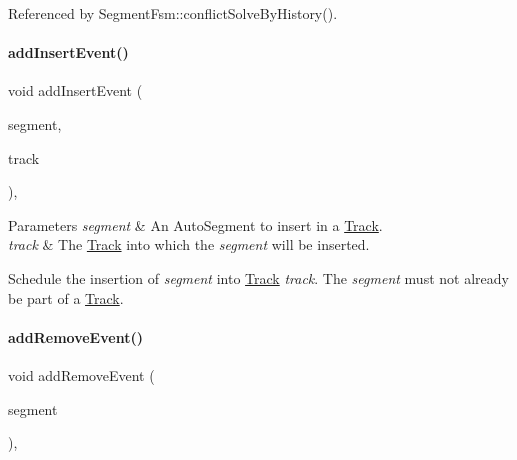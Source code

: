 Referenced by Segment\+Fsm\+::conflict\+Solve\+By\+History().

\mbox{\label{classKite_1_1Session_ad4f08dfb62ce626ed72023ce02e7205f}} 
\paragraph{\texorpdfstring{add\+Insert\+Event()}{addInsertEvent()}}
{\footnotesize\ttfamily void add\+Insert\+Event (\begin{DoxyParamCaption}\item[{\hyperlink{classKite_1_1TrackElement}{Track\+Element} $\ast$}]{segment,  }\item[{\hyperlink{classKite_1_1Track}{Track} $\ast$}]{track }\end{DoxyParamCaption})\hspace{0.3cm}{\ttfamily [inline]}, {\ttfamily [static]}}


\begin{DoxyParams}{Parameters}
{\em segment} & An Auto\+Segment to insert in a \hyperlink{classKite_1_1Track}{Track}. \\
\hline
{\em track} & The \hyperlink{classKite_1_1Track}{Track} into which the {\itshape segment} will be inserted.\\
\hline
\end{DoxyParams}
Schedule the insertion of {\itshape segment} into \hyperlink{classKite_1_1Track}{Track} {\itshape track}. The {\itshape segment} must not already be part of a \hyperlink{classKite_1_1Track}{Track}. \mbox{\label{classKite_1_1Session_aedd573fc951ed93f8ada5b0522813c3a}} 
\paragraph{\texorpdfstring{add\+Remove\+Event()}{addRemoveEvent()}}
{\footnotesize\ttfamily void add\+Remove\+Event (\begin{DoxyParamCaption}\item[{\hyperlink{classKite_1_1TrackElement}{Track\+Element} $\ast$}]{segment }\end{DoxyParamCaption})\hspace{0.3cm}{\ttfamily [inline]}, {\ttfamily [static]}}


